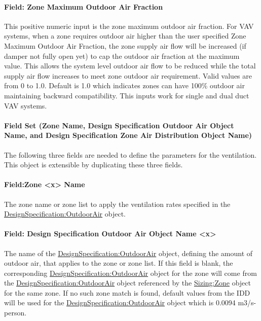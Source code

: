 \paragraph{Field: Zone Maximum Outdoor Air Fraction}\label{field-zone-maximum-outdoor-air-fraction}

This positive numeric input is the zone maximum outdoor air fraction. For VAV systems, when a zone requires outdoor air higher than the user specified Zone Maximum Outdoor Air Fraction, the zone supply air flow will be increased (if damper not fully open yet) to cap the outdoor air fraction at the maximum value. This allows the system level outdoor air flow to be reduced while the total supply air flow increases to meet zone outdoor air requirement. Valid values are from 0 to 1.0. Default is 1.0 which indicates zones can have 100\% outdoor air maintaining backward compatibility. This inputs work for single and dual duct VAV systems.

\paragraph{Field Set (Zone Name, Design Specification Outdoor Air Object Name, and Design Specification Zone Air Distribution Object Name)}\label{field-set-zone-name-design-specification-outdoor-air-object-name-and-design-specification-zone-air-distribution-object-name}

The following three fields are needed to define the parameters for the ventilation. This object is extensible by duplicating these three fields.

\paragraph{Field:Zone \textless{}x\textgreater{} Name}\label{fieldzone-x-name}

The zone name or zone list to apply the ventilation rates specified in the \hyperref[designspecificationoutdoorair]{DesignSpecification:OutdoorAir} object.

\paragraph{Field: Design Specification Outdoor Air Object Name \textless{}x\textgreater{}}\label{field-design-specification-outdoor-air-object-name-x}

The name of the \hyperref[designspecificationoutdoorair]{DesignSpecification:OutdoorAir} object, defining the amount of outdoor air, that applies to the zone or zone list. If this field is blank, the corresponding \hyperref[designspecificationoutdoorair]{DesignSpecification:OutdoorAir} object for the zone will come from the \hyperref[designspecificationoutdoorair]{DesignSpecification:OutdoorAir} object referenced by the \hyperref[sizingzone]{Sizing:Zone} object for the same zone. If no such zone match is found, default values from the IDD will be used for the \hyperref[designspecificationoutdoorair]{DesignSpecification:OutdoorAir} object which is 0.0094 m3/s-person.

